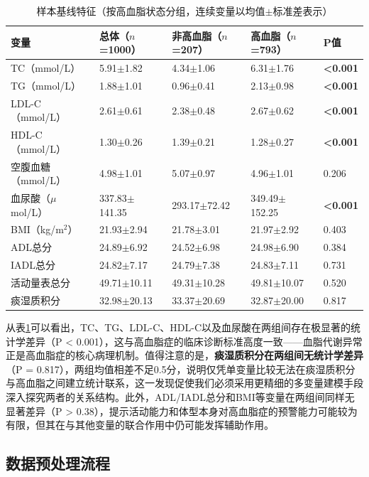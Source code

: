 \documentclass[12pt,a4paper]{ctexart}
\begin{document}
\begin{table}[H]
\centering
\caption{样本基线特征（按高血脂状态分组，连续变量以均值$\pm$标准差表示）}
\label{tab:baseline}
\begin{tabular}{lllll}
\toprule
变量 & 总体（$n$=1000） & 非高血脂（$n$=207） & 高血脂（$n$=793） & P值 \\
\midrule
TC（mmol/L）         & 5.91$\pm$1.82 & 4.34$\pm$1.06 & 6.31$\pm$1.76 & \textbf{<0.001} \\
TG（mmol/L）         & 1.88$\pm$1.01 & 0.96$\pm$0.41 & 2.13$\pm$0.98 & \textbf{<0.001} \\
LDL-C（mmol/L）      & 2.61$\pm$0.61 & 2.38$\pm$0.48 & 2.67$\pm$0.62 & \textbf{<0.001} \\
HDL-C（mmol/L）      & 1.30$\pm$0.26 & 1.39$\pm$0.21 & 1.28$\pm$0.27 & \textbf{<0.001} \\
空腹血糖（mmol/L）   & 4.98$\pm$1.01 & 5.07$\pm$0.97 & 4.96$\pm$1.01 & 0.206 \\
血尿酸（$\mu$mol/L） & 337.83$\pm$141.35 & 293.17$\pm$72.42 & 349.49$\pm$152.25 & \textbf{<0.001} \\
BMI（kg/m$^2$）      & 21.93$\pm$2.94 & 21.78$\pm$3.01 & 21.97$\pm$2.92 & 0.403 \\
ADL总分              & 24.89$\pm$6.92 & 24.52$\pm$6.98 & 24.98$\pm$6.90 & 0.384 \\
IADL总分             & 24.82$\pm$7.17 & 24.79$\pm$7.38 & 24.83$\pm$7.11 & 0.731 \\
活动量表总分         & 49.71$\pm$10.11 & 49.31$\pm$10.28 & 49.81$\pm$10.07 & 0.520 \\
痰湿质积分           & 32.98$\pm$20.13 & 33.37$\pm$20.69 & 32.87$\pm$20.00 & 0.817 \\
\bottomrule
\end{tabular}
\end{table}

从表\ref{tab:baseline}可以看出，TC、TG、LDL-C、HDL-C以及血尿酸在两组间存在极显著的统计学差异（P < 0.001），这与高血脂症的临床诊断标准高度一致——血脂代谢异常正是高血脂症的核心病理机制。值得注意的是，\textbf{痰湿质积分在两组间无统计学差异}（P = 0.817），两组均值相差不足0.5分，说明仅凭单变量比较无法在痰湿质积分与高血脂之间建立统计联系，这一发现促使我们必须采用更精细的多变量建模手段深入探究两者的关系结构。此外，ADL/IADL总分和BMI等变量在两组间同样无显著差异（P > 0.38），提示活动能力和体型本身对高血脂症的预警能力可能较为有限，但其在与其他变量的联合作用中仍可能发挥辅助作用。

\subsection{数据预处理流程}
\end{document}
